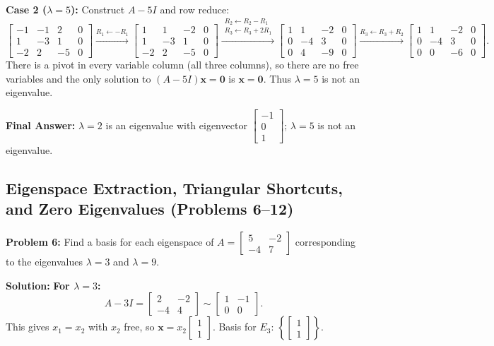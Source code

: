 \documentclass[11pt, letterpaper]{article}
\theoremstyle{definition}
\theoremstyle{remark}
\begin{document}
\textbf{Case 2 ($\lambda = 5$):} Construct $A - 5I$ and row reduce:
\[
\begin{bmatrix} -1 & -1 & 2 & 0 \\ 1 & -3 & 1 & 0 \\ -2 & 2 & -5 & 0 \end{bmatrix}
\xrightarrow{R_1 \leftarrow -R_1}
\begin{bmatrix} 1 & 1 & -2 & 0 \\ 1 & -3 & 1 & 0 \\ -2 & 2 & -5 & 0 \end{bmatrix}
\xrightarrow{\substack{R_2 \leftarrow R_2 - R_1 \\ R_3 \leftarrow R_3 + 2R_1}}
\begin{bmatrix} 1 & 1 & -2 & 0 \\ 0 & -4 & 3 & 0 \\ 0 & 4 & -9 & 0 \end{bmatrix}
\xrightarrow{R_3 \leftarrow R_3 + R_2}
\begin{bmatrix} 1 & 1 & -2 & 0 \\ 0 & -4 & 3 & 0 \\ 0 & 0 & -6 & 0 \end{bmatrix}.
\]
There is a pivot in every variable column (all three columns), so there are no free variables and the only solution to $(A - 5I)\mathbf{x} = \mathbf{0}$ is $\mathbf{x} = \mathbf{0}$. Thus $\lambda = 5$ is not an eigenvalue.

\textbf{Final Answer:} $\lambda = 2$ is an eigenvalue with eigenvector $\begin{bmatrix} -1 \\ 0 \\ 1 \end{bmatrix}$; $\lambda = 5$ is not an eigenvalue.

\subsection{Eigenspace Extraction, Triangular Shortcuts, and Zero Eigenvalues (Problems 6--12)}

\textbf{Problem 6:}
Find a basis for each eigenspace of $A = \begin{bmatrix} 5 & -2 \\ -4 & 7 \end{bmatrix}$ corresponding to the eigenvalues $\lambda = 3$ and $\lambda = 9$.

\textbf{Solution:}
\textbf{For $\lambda = 3$:}
\[
A - 3I = \begin{bmatrix} 2 & -2 \\ -4 & 4 \end{bmatrix} \sim \begin{bmatrix} 1 & -1 \\ 0 & 0 \end{bmatrix}.
\]
This gives $x_1 = x_2$ with $x_2$ free, so $\mathbf{x} = x_2 \begin{bmatrix} 1 \\ 1 \end{bmatrix}$. Basis for $E_3$: $\left\{ \begin{bmatrix} 1 \\ 1 \end{bmatrix} \right\}$.
\end{document}
